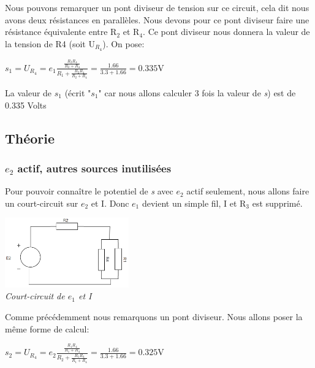\documentclass[a4paper,12pt,titlepage]{article}
\begin{document}
Nous pouvons remarquer un pont diviseur de tension sur ce circuit, cela dit nous avons deux résistances en parallèles. Nous devons pour ce pont diviseur faire une résistance équivalente entre R$_2$ et R$_4$. Ce pont diviseur nous donnera la valeur de la tension de R4 (soit U$_{R_4}$). On pose:\\

\begin{center}
    $s_1 = U_{R_4} = e_1 \frac{\frac{R_2R_4}{R_2+R_4}}{R_1+\frac{R_2R_4}{R_2+R_4}} = \frac{1.66}{3.3+1.66} = 0.335$V 
\end{center}

La valeur de $s_1$ (écrit "$s_1$" car nous allons calculer 3 fois la valeur de \textit{s}) est de 0.335 Volts

\subsection{Théorie}

\subsubsection{$e_2$ actif, autres sources inutilisées}

Pour pouvoir connaître le potentiel de \textit{s} avec $e_2$ actif seulement, nous allons faire un court-circuit sur $e_2$ et I.
Donc  $e_1$ devient un simple fil, I et R$_3$ est supprimé. 

\begin{center}
    \includegraphics[width=0.4\textwidth]{Exo1/Exo1-2.PNG}\\
    \textit{Court-circuit de $e_1$ et I}\\
\end{center}

Comme précédemment nous remarquons un pont diviseur. Nous allons poser la même forme de calcul:\\


\begin{center}
    $s_2 = U_{R_4} = e_2 \frac{\frac{R_1R_4}{R_1+R_4}}{R_2+\frac{R_1R_4}{R_1+R_4}} = \frac{1.66}{3.3+1.66} = 0.325$V 
\end{center}
\end{document}
